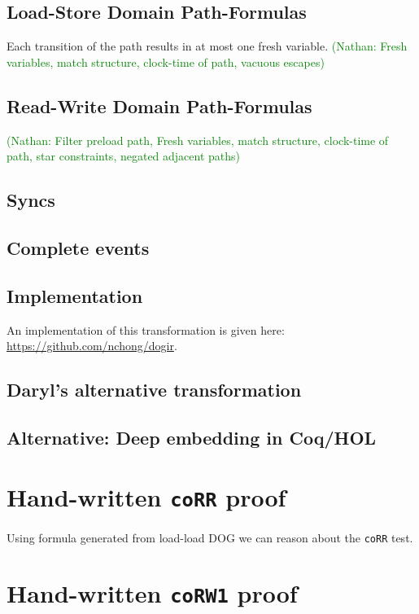 \documentclass[10pt]{paper}
\newcommand{\litmus}[1]{\texttt{#1}}
\newcommand{\NCComment}[1]{\textcolor{green}{(Nathan: #1)}}
\begin{document}
\subsection{Load-Store Domain Path-Formulas}
%
Each transition of the path results in at most one fresh variable.
%
\NCComment{Fresh variables, match structure, clock-time of path, vacuous escapes}

\subsection{Read-Write Domain Path-Formulas}
%
\NCComment{Filter preload path, Fresh variables, match structure, clock-time of path, star constraints, negated adjacent paths}

\subsection{Syncs}

\subsection{Complete events}

\subsection{Implementation}

An implementation of this transformation is given here: \url{https://github.com/nchong/dogir}.

\subsection{Daryl's alternative transformation}

\subsection{Alternative: Deep embedding in Coq/HOL}

\section{Hand-written \litmus{coRR} proof}
%
Using formula generated from load-load DOG we can reason about the \litmus{coRR} test.

\section{Hand-written \litmus{coRW1} proof}
\end{document}
